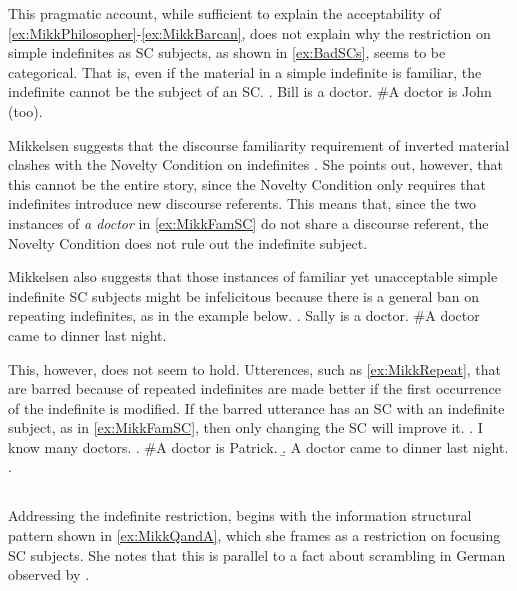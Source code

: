 \documentclass[GPFinal]{subfiles}
\begin{document}
This pragmatic account, while sufficient to explain the acceptability of \ref{ex:MikkPhilosopher}-\ref{ex:MikkBarcan}, does not explain why the restriction on simple indefinites as SC subjects, as shown in \ref{ex:BadSCs}, seems to be categorical.
That is, even if the material in a simple indefinite is familiar, the indefinite cannot be the subject of an SC.
\ex.\label{ex:MikkFamSC} Bill is a doctor. \#A doctor is John (too).

Mikkelsen suggests that the discourse familiarity requirement of inverted material clashes with the Novelty Condition on indefinites \parencite{heim1982semantics}.
She points out, however, that this cannot be the entire story, since the Novelty Condition only requires that indefinites introduce new discourse referents.
This means that, since the two instances of \textit{a doctor} in \ref{ex:MikkFamSC} do not share a discourse referent, the Novelty Condition does not rule out the indefinite subject.

Mikkelsen also suggests that those instances of familiar yet unacceptable simple indefinite SC subjects might be infelicitous because there is a general ban on repeating indefinites, as in the example below.
\ex.\label{ex:MikkRepeat} Sally is a doctor. \#A doctor came to dinner last night.

This, however, does not seem to hold.
Utterences, such as \ref{ex:MikkRepeat}, that are barred because of repeated indefinites are made better if the first occurrence of the indefinite is modified.
If the barred utterance has an SC with an indefinite subject, as in \ref{ex:MikkFamSC}, then only changing the SC will improve it.
\ex. I know many doctors.
\a. \#A doctor is Patrick.
\b. A doctor came to dinner last night.
\z.

\subsection{\textcite{heycock2012specification}}
Addressing the indefinite restriction, \textcite{heycock2012specification} begins with the information structural pattern shown in \ref{ex:MikkQandA}, which she frames as a restriction on focusing SC subjects.
She notes that this is parallel to a fact about scrambling in German observed by \textcite{lenerz1977zur}.
\end{document}

